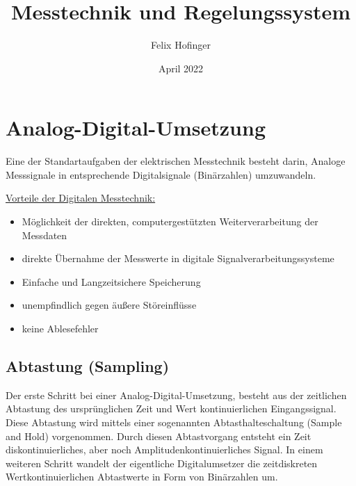 \documentclass{article}
\title{Messtechnik und Regelungssystem}
\author{Felix Hofinger}
\date{April 2022}
\begin{document}
\maketitle
\newpage
\tableofcontents
\newpage

\section{Analog-Digital-Umsetzung}
Eine der Standartaufgaben der elektrischen Messtechnik besteht darin, Analoge Messsignale in entsprechende Digitalsignale (Binärzahlen) umzuwandeln.



\underline{Vorteile der Digitalen Messtechnik:}

\begin{itemize}
  \item Möglichkeit der direkten, computergestützten Weiterverarbeitung der Messdaten
  \item direkte Übernahme der Messwerte in digitale Signalverarbeitungssysteme
  \item Einfache und Langzeitsichere Speicherung
  \item unempfindlich gegen äußere Störeinflüsse
  \item keine Ablesefehler
\end{itemize}

\subsection{Abtastung (Sampling)}

Der erste Schritt bei einer Analog-Digital-Umsetzung, besteht aus der zeitlichen Abtastung des ursprünglichen Zeit und Wert kontinuierlichen Eingangssignal. Diese Abtastung wird mittels einer sogenannten Abtasthalteschaltung (Sample and Hold) vorgenommen. Durch diesen Abtastvorgang entsteht ein Zeit diskontinuierliches, aber noch Amplitudenkontinuierliches Signal. In einem weiteren Schritt wandelt der eigentliche Digitalumsetzer die zeitdiskreten Wertkontinuierlichen Abtastwerte in Form von Binärzahlen um.
\end{document}
